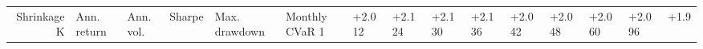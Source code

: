 \begin{tabular}{rlllllll}
\toprule
Shrinkage K & Ann. return & Ann. vol. & Sharpe & Max. drawdown & Monthly CVaR 1%
 & +2.0%
12 & +2.1%
24 & +2.1%
30 & +2.1%
36 & +2.0%
42 & +2.0%
48 & +2.0%
60 & +2.0%
96 & +1.9%
\bottomrule
\end{tabular}
